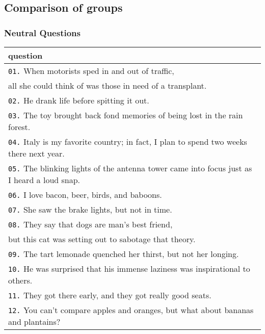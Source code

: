 \documentclass[11pt, twoside, reqno]{book}
\begin{document}
\subsection{Comparison of groups}


\subsubsection{\textbf{Neutral Questions}}

\begin{tabular}{|l|}
\hline
    question \\ \hline
    \texttt{01.}\hspace{8pt} When motorists sped in and out of traffic,\\\hspace{24pt} all she could think of was those in need of a transplant. \\ \hline
    \texttt{02.}\hspace{8pt} He drank life before spitting it out. \\ \hline
    \texttt{03.}\hspace{8pt} The toy brought back fond memories of being lost in the rain forest. \\ \hline
    \texttt{04.}\hspace{8pt} Italy is my favorite country; in fact, I plan to spend two weeks there next year. \\ \hline
    \texttt{05.}\hspace{8pt} The blinking lights of the antenna tower came into focus just as I heard a loud snap. \\ \hline
    \texttt{06.}\hspace{8pt} I love bacon, beer, birds, and baboons. \\ \hline
    \texttt{07.}\hspace{8pt} She saw the brake lights, but not in time. \\ \hline
    \texttt{08.}\hspace{8pt} They say that dogs are man's best friend, \\\hspace{24pt} but this cat was setting out to sabotage that theory. \\ \hline
    \texttt{09.}\hspace{8pt} The tart lemonade quenched her thirst, but not her longing. \\ \hline
    \texttt{10.}\hspace{8pt} He was surprised that his immense laziness was inspirational to others. \\ \hline
    \texttt{11.}\hspace{8pt} They got there early, and they got really good seats. \\ \hline
    \texttt{12.}\hspace{8pt} You can't compare apples and oranges, but what about bananas and plantains? \\ \hline
\end{tabular}
\vspace{16pt}
\end{document}
